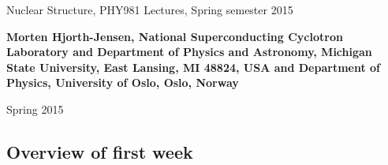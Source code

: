 \documentclass[%
twoside,                 %
final,                   %
10pt]{article}
\begin{document}




\thispagestyle{empty}

\begin{center}
{\LARGE\bf
\begin{spacing}{1.25}
Nuclear Structure, PHY981  Lectures, Spring semester 2015
\end{spacing}
}
\end{center}


\begin{center}
{\bf Morten Hjorth-Jensen, National Superconducting Cyclotron Laboratory and Department of Physics and Astronomy, Michigan State University, East Lansing, MI 48824, USA and Department of Physics, University of Oslo, Oslo, Norway${}^{}$} \\ [0mm]
\end{center}

    \begin{center}
\end{center}
    

\begin{center} %
Spring 2015 
\end{center}

\vspace{1cm}


\subsection*{Overview of first week}

\paragraph{}
\end{document}

